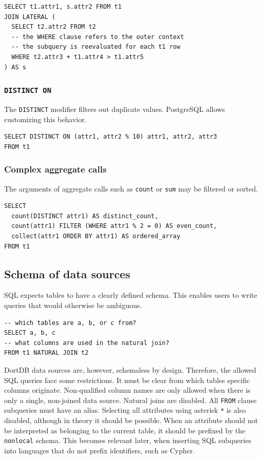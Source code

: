 \begin{verbatim}
SELECT t1.attr1, s.attr2 FROM t1
JOIN LATERAL (
  SELECT t2.attr2 FROM t2
  -- the WHERE clause refers to the outer context
  -- the subquery is reevaluated for each t1 row
  WHERE t2.attr3 + t1.attr4 > t1.attr5
) AS s
\end{verbatim}

\subsubsection*{\texttt{DISTINCT ON}}

The \texttt{DISTINCT} modifier filters out duplicate values. PostgreSQL allows customizing this behavior.

\begin{verbatim}
SELECT DISTINCT ON (attr1, attr2 % 10) attr1, attr2, attr3
FROM t1
\end{verbatim}

\subsubsection*{Complex aggregate calls}

The arguments of aggregate calls such as \texttt{count} or \texttt{sum} may be filtered or sorted.

\begin{verbatim}
SELECT
  count(DISTINCT attr1) AS distinct_count,
  count(attr1) FILTER (WHERE attr1 % 2 = 0) AS even_count,
  collect(attr1 ORDER BY attr1) AS ordered_array
FROM t1
\end{verbatim}

\subsection{Schema of data sources}
\label{subsec:sql-schema-data-sources}

SQL expects tables to have a clearly defined schema. This enables users to write queries that would otherwise be ambiguous.

\begin{verbatim}
-- which tables are a, b, or c from?
SELECT a, b, c
-- what columns are used in the natural join?
FROM t1 NATURAL JOIN t2
\end{verbatim}

DortDB data sources are, however, schemaless by design. Therefore, the allowed SQL queries face some restrictions. It must be clear from which tables specific columns originate. Non-qualified column names are only allowed when there is only a single, non-joined data source. Natural joins are disabled. All \texttt{FROM} clause subqueries must have an alias. Selecting all attributes using asterisk \texttt{*} is also disabled, although in theory it should be possible. When an attribute should not be interpreted as belonging to the current table, it should be prefixed by the \texttt{nonlocal} schema. This becomes relevant later, when inserting SQL subqueries into languages that do not prefix identifiers, such as Cypher.

